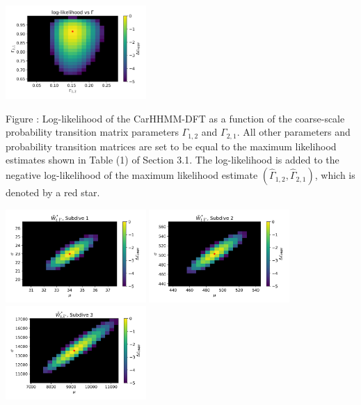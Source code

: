 \documentclass{article}
\begin{document}
        
        \begin{center}
        \includegraphics[width=2.1in]{../Plots/2019/20190902-182840-CATs_OB_1_0_267_CarHHMM2_coarse-gamma-likelihood.png}
        \end{center}
        
        \noindent Figure : Log-likelihood of the CarHHMM-DFT as a function of the coarse-scale probability transition matrix parameters $\Gamma_{1,2}$ and $\Gamma_{2,1}$. All other parameters and probability transition matrices are set to be equal to the maximum likelihood estimates shown in Table (1) of Section 3.1. The log-likelihood is added to the negative log-likelihood of the maximum likelihood estimate $(\hat \Gamma_{1,2},\hat \Gamma_{2,1})$, which is denoted by a red star.
        \addtocounter{fignum}{1}
        
        \begin{center}
        \includegraphics[width=2.1in]{../Plots/2019/20190902-182840-CATs_OB_1_0_267_CarHHMM2_fine-theta-likelihood-Ahat_low-0.png}
        \includegraphics[width=2.1in]{../Plots/2019/20190902-182840-CATs_OB_1_0_267_CarHHMM2_fine-theta-likelihood-Ahat_low-1.png}
        \includegraphics[width=2.1in]{../Plots/2019/20190902-182840-CATs_OB_1_0_267_CarHHMM2_fine-theta-likelihood-Ahat_low-2.png}
        \end{center}
        
\end{document}
